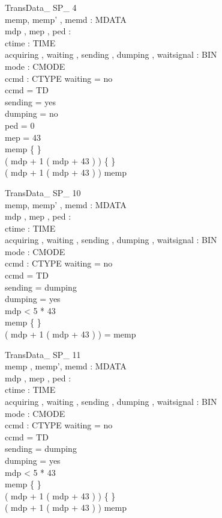 \begin{schema}{TransData\_ SP\_ 4}\\
 memp, memp' , memd : \seq MDATA \\
 mdp , mep , ped : \nat \\
 ctime : TIME \\
 acquiring , waiting , sending , dumping , waitsignal : BIN \\
 mode : CMODE \\
 ccmd : CTYPE 
\where
 waiting = no \\
 ccmd = TD \\
 sending = yes \\
 dumping = no \\
 ped = 0 \\
 mep = 43 \\
 memp \neq \{ \} \\
 ( mdp + 1 \upto ( mdp + 43 ) ) \neq \{ \} \\
 ( mdp + 1 \upto ( mdp + 43 ) ) \subset \dom memp
\end{schema}

\begin{schema}{TransData\_ SP\_ 10}\\
 memp, memp' , memd : \seq MDATA \\
 mdp , mep , ped : \nat \\
 ctime : TIME \\
 acquiring , waiting , sending , dumping , waitsignal : BIN \\
 mode : CMODE \\
 ccmd : CTYPE 
\where
 waiting = no \\
 ccmd = TD \\
 sending = dumping \\
 dumping = yes \\
 mdp < 5 * 43 \\
 memp \neq \{ \} \\
 ( mdp + 1 \upto ( mdp + 43 ) ) = \dom memp
\end{schema}


\begin{schema}{TransData\_ SP\_ 11}\\
 memp , memp', memd : \seq MDATA \\
 mdp , mep , ped : \nat \\
 ctime : TIME \\
 acquiring , waiting , sending , dumping , waitsignal : BIN \\
 mode : CMODE \\
 ccmd : CTYPE 
\where
 waiting = no \\
 ccmd = TD \\
 sending = dumping \\
 dumping = yes \\
 mdp < 5 * 43 \\
 memp \neq \{ \} \\
 ( mdp + 1 \upto ( mdp + 43 ) ) \neq \{ \} \\
 ( mdp + 1 \upto ( mdp + 43 ) ) \subset \dom memp
\end{schema}


